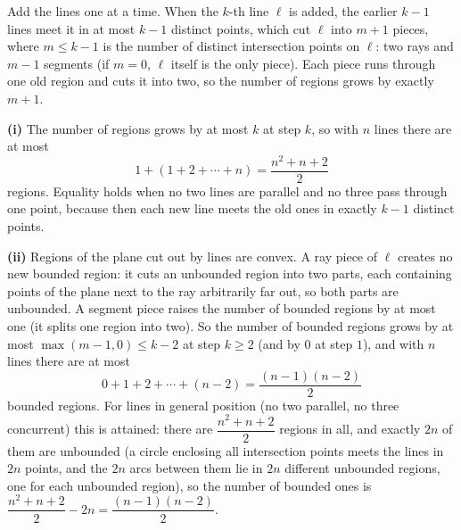 Add the lines one at a time. When the $k$-th line $\ell$ is added, the earlier $k-1$ lines meet it in at most $k-1$ distinct points, which cut $\ell$ into $m+1$ pieces, where $m\le k-1$ is the number of distinct intersection points on $\ell$: two rays and $m-1$ segments (if $m=0$, $\ell$ itself is the only piece). Each piece runs through one old region and cuts it into two, so the number of regions grows by exactly $m+1$.

\textbf{(i)} The number of regions grows by at most $k$ at step $k$, so with $n$ lines there are at most
\[
1+(1+2+\cdots+n)=\boxed{\dfrac{n^2+n+2}{2}}
\]
regions. Equality holds when no two lines are parallel and no three pass through one point, because then each new line meets the old ones in exactly $k-1$ distinct points.

\textbf{(ii)} Regions of the plane cut out by lines are convex. A ray piece of $\ell$ creates no new bounded region: it cuts an unbounded region into two parts, each containing points of the plane next to the ray arbitrarily far out, so both parts are unbounded. A segment piece raises the number of bounded regions by at most one (it splits one region into two). So the number of bounded regions grows by at most $\max(m-1,0)\le k-2$ at step $k\ge2$ (and by $0$ at step $1$), and with $n$ lines there are at most
\[
0+1+2+\cdots+(n-2)=\boxed{\dfrac{(n-1)(n-2)}{2}}
\]
bounded regions. For lines in general position (no two parallel, no three concurrent) this is attained: there are $\dfrac{n^2+n+2}{2}$ regions in all, and exactly $2n$ of them are unbounded (a circle enclosing all intersection points meets the lines in $2n$ points, and the $2n$ arcs between them lie in $2n$ different unbounded regions, one for each unbounded region), so the number of bounded ones is $\dfrac{n^2+n+2}{2}-2n=\dfrac{(n-1)(n-2)}{2}$.
